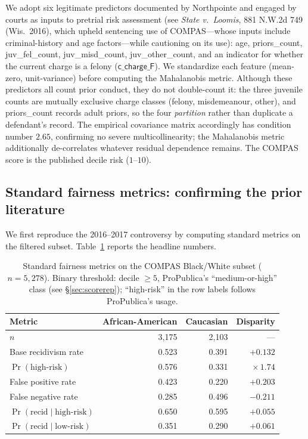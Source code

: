 \documentclass[11pt]{article}
\begin{document}
We adopt six legitimate predictors documented by Northpointe and
engaged by courts as inputs to pretrial risk assessment (see
\emph{State v.\ Loomis}, 881 N.W.2d 749 (Wis.\ 2016), which upheld
sentencing use of COMPAS---whose inputs include criminal-history and
age factors---while cautioning on its use):
\textsf{age}, \textsf{priors\_count}, \textsf{juv\_fel\_count},
\textsf{juv\_misd\_count}, \textsf{juv\_other\_count}, and an
indicator for whether the current charge is a felony
($\mathsf{c\_charge\_F}$). We standardize each feature
(mean-zero, unit-variance) before computing the Mahalanobis metric.
Although these predictors all count prior conduct, they do not
double-count it: the three juvenile counts are mutually exclusive charge
classes (felony, misdemeanour, other), and \textsf{priors\_count} records
adult priors, so the four \emph{partition} rather than duplicate a
defendant's record. The empirical covariance matrix accordingly has
condition number $2.65$, confirming no severe multicollinearity; the
Mahalanobis metric additionally de-correlates whatever residual
dependence remains. The COMPAS score is the published decile risk
($1$--$10$).

\subsection{Standard fairness metrics: confirming the prior literature}

We first reproduce the 2016--2017 controversy by computing standard
metrics on the filtered subset. Table~\ref{tab:standard} reports
the headline numbers.

\begin{table}[h]
\centering
\caption{Standard fairness metrics on the COMPAS Black/White subset
($n{=}5{,}278$). Binary threshold: decile $\geq 5$, ProPublica's
``medium-or-high'' class (see \S\ref{sec:scorerep}); ``high-risk''
in the row labels follows ProPublica's usage.}
\label{tab:standard}
\begin{tabular}{lrrr}
\toprule
\textbf{Metric} & \textbf{African-American} & \textbf{Caucasian} & \textbf{Disparity} \\
\midrule
$n$                   & 3{,}175 & 2{,}103 & --- \\
Base recidivism rate  & 0.523 & 0.391 & $+0.132$ \\
$\Pr(\text{high-risk})$ & 0.576 & 0.331 & $\times\,1.74$ \\
False positive rate   & 0.423 & 0.220 & $+0.203$ \\
False negative rate   & 0.285 & 0.496 & $-0.211$ \\
$\Pr(\text{recid}\mid\text{high-risk})$ & 0.650 & 0.595 & $+0.055$ \\
$\Pr(\text{recid}\mid\text{low-risk})$  & 0.351 & 0.290 & $+0.061$ \\
\bottomrule
\end{tabular}
\end{table}
\end{document}
